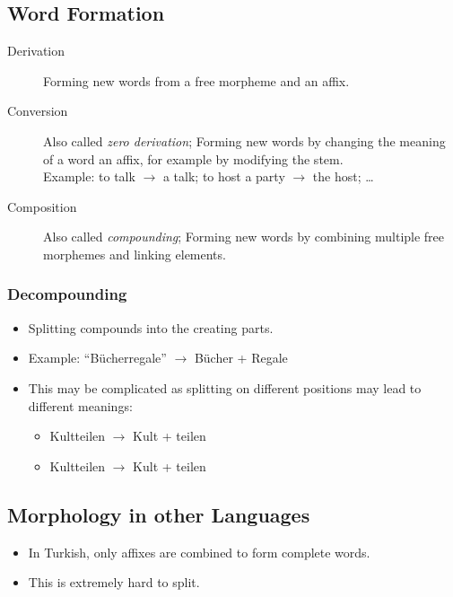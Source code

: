         \subsection{Word Formation} %
        	\begin{description}
        		\item[Derivation] Forming new words from a free morpheme and an affix.
        		\item[Conversion] Also called \textit{zero derivation}; Forming new words by changing the meaning of a word an affix, for example by modifying the stem. \\ Example: to talk \(\rightarrow\) a talk; to host a party \(\rightarrow\) the host; \dots
        		\item[Composition] Also called \textit{compounding}; Forming new words by combining multiple free morphemes and linking elements.
        	\end{description}

            \subsubsection{Decompounding} %
                \begin{itemize}
                	\item Splitting compounds into the creating parts.
                	\item Example: \enquote{Bücherregale} \(\rightarrow\) Bücher + Regale
                	\item This may be complicated as splitting on different positions may lead to different meanings:
                		\begin{itemize}
                			\item Kultteilen \(\rightarrow\) Kult + teilen
                			\item Kultteilen \(\rightarrow\) Kult + teilen
                		\end{itemize}
                \end{itemize}

        \subsection{Morphology in other Languages} %
            \begin{itemize}
            	\item In Turkish, only affixes are combined to form complete words.
            	\item This is extremely hard to split.
            \end{itemize}

